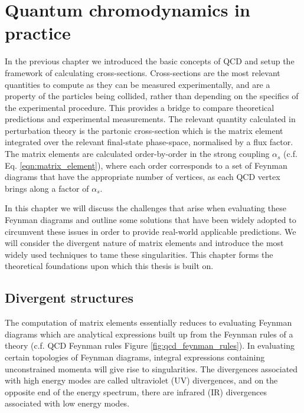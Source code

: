 \documentclass[main.tex]{subfiles}
\begin{document}
\chapter{Quantum chromodynamics in practice}
\label{chapter:qcd}
    In the previous chapter we introduced the basic concepts
    of QCD and setup the framework of calculating
    cross-sections. Cross-sections are the most relevant
    quantities to compute as they can be measured
    experimentally, and are a property of the particles
    being collided, rather than depending on the
    specifics of the experimental procedure.
    This provides a bridge to compare
    theoretical predictions and experimental measurements.
    The relevant quantity calculated in perturbation theory
    is the partonic cross-section which
    is the matrix element integrated over the relevant
    final-state phase-space, normalised by a flux factor.
    The matrix elements are
    calculated order-by-order in the strong coupling
    $\alpha_{s}$ (c.f. Eq. \ref{eqn:matrix_element}),
    where each order corresponds to a set of Feynman diagrams
    that have the appropriate number of vertices,
    as each QCD vertex brings along a factor of $\alpha_{s}$.

    In this chapter we will discuss the challenges that
    arise when evaluating these Feynman diagrams and outline
    some solutions that have been widely adopted to circumvent
    these issues in order to provide real-world applicable predictions.
    We will consider the divergent nature of matrix
    elements and introduce the most widely used techniques
    to tame these singularities.
    This chapter forms the theoretical foundations upon which
    this thesis is built on.


\section{Divergent structures}\label{sec:divergences}
    The computation of matrix elements essentially reduces
    to evaluating Feynman diagrams which are analytical expressions
    built up from the Feynman rules of a theory (c.f. QCD Feynman rules
    Figure \ref{fig:qcd_feynman_rules}). In evaluating certain
    topologies of Feynman diagrams, integral expressions
    containing unconstrained momenta will give rise to
    singularities. The divergences
    associated with high energy modes are called ultraviolet
    (UV) divergences, and on the opposite end of the energy
    spectrum, there are infrared (IR) divergences associated
    with low energy modes.
\end{document}
